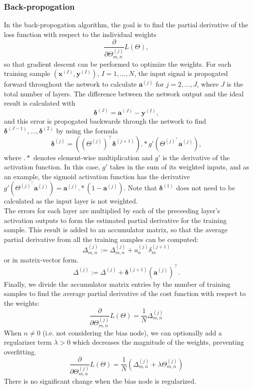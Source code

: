 \documentclass[a4paper,12pt]{article}
\numberwithin{equation}{section}
\begin{document}
\subsubsection{Back-propogation}
In the back-propogation algorithm, the goal is to find the partial derivative of the loss function with respect to the individual weights \[\frac{\partial}{\partial\Theta_{m,n}^{(j)}}L(\Theta),\]
so that gradient descent can be performed to optimize the weights. For each training sample $(\bm{x}^{(I)},\bm{y}^{(I)})$, $I=1,\dots,N$, the input signal is propogated forward throughout the network to calculate $\bm{a}^{(j)}$ for $j=2,\dots,J$, where $J$ is the total number of layers. The difference between the network output and the ideal result is calculated with 
\[\bm{\delta}^{(J)}=\bm{a}^{(J)}-\bm{y}^{(I)},\] 
and this error is propogated backwards through the network to find $\bm{\delta}^{(J-1)},\dots,\bm{\delta}^{(2)}$ by using the formula 
\[\bm{\delta}^{(j)}=((\Theta^{(j)})^\top \bm{\delta}^{(j+1)}).*g'(\Theta^{(j)^\top} \bm{a}^{(j)}),\] 
where $.*$ denotes element-wise multiplication and $g'$ is the derivative of the activation function. In this case, $g'$ takes in the sum of its weighted inputs, and as an example, the sigmoid activation function has the derivative $g'(\Theta^{(j)^\top} \bm{a}^{(j)})=\bm{a}^{(j)}.*(1-\bm{a}^{(j)})$. Note that $\bm{\delta}^{(1)}$ does not need to be calculated as the input layer is not weighted. \\
The errors for each layer are multiplied by each of the preceeding layer's activation outputs to form the estimated partial derivative for the training sample. This result is added to an accumulator matrix, so that the average partial derivative from all the training samples can be computed:
\[\Delta^{(j)}_{m,n}:=\Delta^{(j)}_{m,n}+a_n^{(j)}\delta_m^{(j+1)}\]
or in matrix-vector form.
\[\Delta^{(j)}:=\Delta^{(j)}+\bm{\delta}^{(j+1)}(\bm{a}^{(j)})^\top.\]
Finally, we divide the accumulator matrix entries by the number of training samples to find the average partial derivative of the cost function with respect to the weights:
\[\frac{\partial}{\partial \Theta^{(j)}_{m,n}}L(\Theta)=\frac1N \Delta_{m,n}^{(j)}\]
When $n\neq0$ (i.e. not considering the bias node), we can optionally add a regularizer term $\lambda > 0$ which decreases the magnitude of the weights, preventing overfitting. 
\[\frac{\partial}{\partial \Theta^{(j)}_{m,n}}L(\Theta)=\frac1N (\Delta_{m,n}^{(j)}+\lambda \Theta_{m,n}^{(j)})\]
There is no significant change when the bias node is regularized.\\
\end{document}
